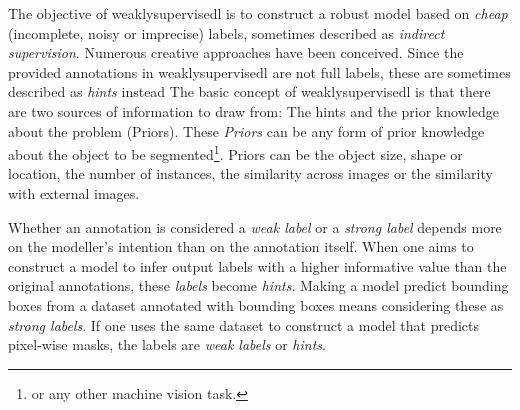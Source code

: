 \par{
    The objective of \Gls{weaklysupervisedl} is to construct a robust model based on \textit{cheap} (incomplete, noisy or imprecise) labels, sometimes described as \textit{indirect supervision}.
    Numerous creative approaches have been conceived.
    Since the provided annotations in \Gls{weaklysupervisedl} are not full labels, these are sometimes described as \textit{hints} instead
    The basic concept of \Gls{weaklysupervisedl} is that there are two sources of information to draw from: The hints and the prior knowledge about the problem (Priors).
    These \textit{Priors} can be any form of prior knowledge about the object to be segmented\footnote{or any other machine vision task.}.
    Priors can be the object size, shape or location, the number of instances, the similarity across images or the similarity with external images.
}
\par{
    Whether an annotation is considered a \textit{weak label} or a \textit{strong label} depends more on the modeller's intention than on the annotation itself. 
    When one aims to construct a model to infer output labels with a higher informative value than the original annotations, these \textit{labels} become \textit{hints}.
    Making a model predict bounding boxes from a dataset annotated with bounding boxes means considering these as \textit{strong labels}. 
    If one uses the same dataset to construct a model that predicts pixel-wise masks, the labels are \textit{weak labels} or \textit{hints}.
}


